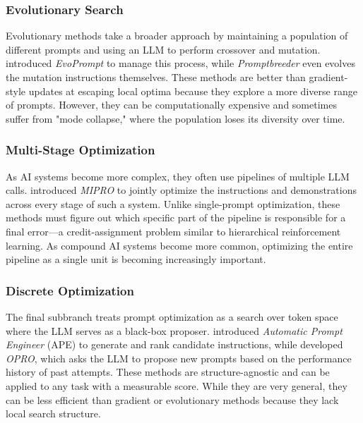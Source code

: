 \subsubsection{Evolutionary Search}

Evolutionary methods take a broader approach by maintaining a population of different prompts and using an LLM to perform crossover and mutation. \citet{guo2024evoprompt} introduced \textit{EvoPrompt} to manage this process, while \textit{Promptbreeder} \citep{fernando2023promptbreeder} even evolves the mutation instructions themselves. These methods are better than gradient-style updates at escaping local optima because they explore a more diverse range of prompts. However, they can be computationally expensive and sometimes suffer from "mode collapse," where the population loses its diversity over time.

\subsubsection{Multi-Stage Optimization}

As AI systems become more complex, they often use pipelines of multiple LLM calls. \citet{opsahlong2024mipro} introduced \textit{MIPRO} to jointly optimize the instructions and demonstrations across every stage of such a system. Unlike single-prompt optimization, these methods must figure out which specific part of the pipeline is responsible for a final error—a credit-assignment problem similar to hierarchical reinforcement learning. As compound AI systems become more common, optimizing the entire pipeline as a single unit is becoming increasingly important.

\subsubsection{Discrete Optimization}

The final subbranch treats prompt optimization as a search over token space where the LLM serves as a black-box proposer. \citet{zhou2023ape} introduced \textit{Automatic Prompt Engineer} (APE) to generate and rank candidate instructions, while \citet{yang2024opro} developed \textit{OPRO}, which asks the LLM to propose new prompts based on the performance history of past attempts. These methods are structure-agnostic and can be applied to any task with a measurable score. While they are very general, they can be less efficient than gradient or evolutionary methods because they lack local search structure.


